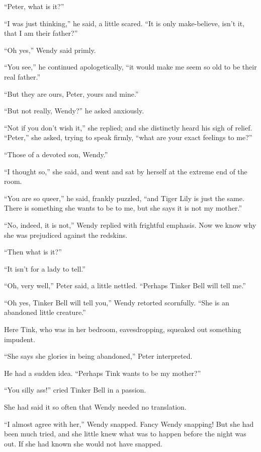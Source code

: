``Peter, what is it?''

``I was just thinking,'' he said, a little scared. ``It is only
make-believe, isn't it, that I am their father?''

``Oh yes,'' Wendy said primly.

``You see,'' he continued apologetically, ``it would make me seem so old
to be their real father.''

``But they are ours, Peter, yours and mine.''

``But not really, Wendy?'' he asked anxiously.

``Not if you don't wish it,'' she replied; and she distinctly heard his
sigh of relief. ``Peter,'' she asked, trying to speak firmly, ``what are
your exact feelings to me?''

``Those of a devoted son, Wendy.''

``I thought so,'' she said, and went and sat by herself at the extreme
end of the room.

``You are so queer,'' he said, frankly puzzled, ``and Tiger Lily is just
the same. There is something she wants to be to me, but she says it is
not my mother.''

``No, indeed, it is not,'' Wendy replied with frightful emphasis. Now we
know why she was prejudiced against the redskins.

``Then what is it?''

``It isn't for a lady to tell.''

``Oh, very well,'' Peter said, a little nettled. ``Perhaps Tinker Bell
will tell me.''

``Oh yes, Tinker Bell will tell you,'' Wendy retorted scornfully. ``She is
an abandoned little creature.''

Here Tink, who was in her bedroom, eavesdropping, squeaked out
something impudent.

``She says she glories in being abandoned,'' Peter interpreted.

He had a sudden idea. ``Perhaps Tink wants to be my mother?''

``You silly ass!'' cried Tinker Bell in a passion.

She had said it so often that Wendy needed no translation.

``I almost agree with her,'' Wendy snapped. Fancy Wendy snapping! But she
had been much tried, and she little knew what was to happen before the
night was out. If she had known she would not have snapped.


